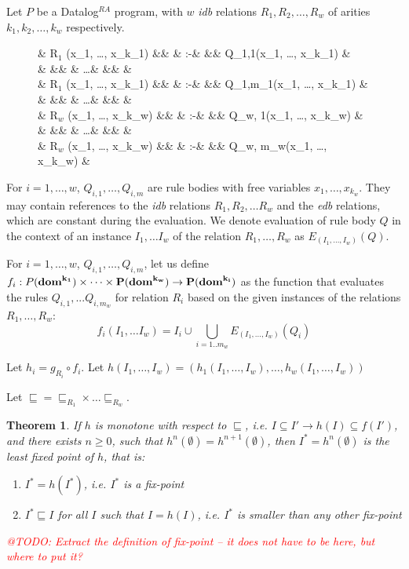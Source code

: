 \documentclass{pracamgr}
\makeatletter
\theoremstyle{plain}
\newtheorem{thm}{Theorem}[section]
\theoremstyle{definition}
\theoremstyle{remark}
\newcommand{\todo}[1]{\textcolor{red}{@TODO: #1}}
\newcommand{\datalogra}{Datalog$^{RA}$ }
\newcommand{\assign}{:-}
\newcommand{\narrow}[1]{\begin{changemargin}{2cm}{2cm} #1 \end{changemargin}}
\makeatother
\begin{document}
Let $P$ be a \datalogra program, with $w$ \emph{idb} relations $R_1, R_2, \dots, R_w$ of arities $k_1, k_2, \dots, k_w$ respectively.

\begin{figure}[h!]
\narrow{
  \begin{flalign*}
  & \textsc{R$_1$} (x_1, \dots, x_{k_1}) &&  & \assign & && Q_{1,1}(x_1, \dots, x_{k_1}) & \\
  &  &&  & \dots & && & \\
  & \textsc{R$_1$} (x_1, \dots, x_{k_1}) &&  & \assign & && Q_{1,{m_1}}(x_1, \dots, x_{k_1}) & \\
  &  &&  & \dots & && & \\
  & \textsc{R$_w$} (x_1, \dots, x_{k_w}) &&  & \assign & && Q_{w, 1}(x_1, \dots, x_{k_w}) & \\
  &  &&  & \dots & && & \\
  & \textsc{R$_w$} (x_1, \dots, x_{k_w}) &&  & \assign & && Q_{w, {m_w}}(x_1, \dots, x_{k_w}) & \\
  \end{flalign*}
}
\end{figure}

For $i = 1, \dots, w$, $Q_{i,1}, \dots, Q_{i,m}$ are rule bodies with free variables $x_1, \dots, x_{k_w}$. They may contain references to the \emph{idb} relations $R_1, R_2, \dots R_w$ and the \emph{edb} relations, which are constant during the evaluation. We denote evaluation of rule body $Q$ in the context of an instance $I_1, \dots I_w$ of the relation $R_1, \dots, R_w$ as $E_(I_1, \dots, I_w)(Q)$.

For $i = 1, \dots, w$, $Q_{i,1}, \dots, Q_{i,m}$, let us define $f_i: P(\bf{dom}^{k_1}) \times \dots \times P(\bf{dom}^{k_w}) \to P(\bf{dom}^{k_i})$ as the function that evaluates the rules $Q_{i,1}, ... Q_{i, m_w}$ for relation $R_i$ based on the given instances of the relations $R_1, \dots, R_w$:
$$ f_i(I_1, \dots I_w) = I_i \cup \bigcup_{i=1..{m_w}} E_(I_1, \dots, I_w)(Q_i) $$

Let $h_i = g_{R_i} \circ f_i$. Let $h(I_1, \dots, I_w) = (h_1(I_1, \dots, I_w), \dots, h_w(I_1, \dots, I_w))$

Let $\sqsubseteq = \sqsubseteq_{R_1} \times \dots \sqsubseteq_{R_w}$.

\begin{thm}
If $h$ is monotone with respect to $\sqsubseteq$, i.e. $I \subseteq I' \rightarrow h(I) \subseteq f(I')$, and there exists $n \ge 0 $, such that $h^n(\emptyset) = h^{n+1}(\emptyset)$, then $I^* = h^n(\emptyset)$ is the least fixed point of $h$, that is:
\begin{enumerate}
\item $I^* = h(I^*)$, i.e. $I^*$ is a fix-point
\item $I^* \sqsubseteq I$ for all $I$ such that $I = h(I)$, i.e. $I^*$ is smaller than any other fix-point
\end{enumerate}
\todo{Extract the definition of fix-point -- it does not have to be here, but where to put it?}
\end{thm}
\end{document}
